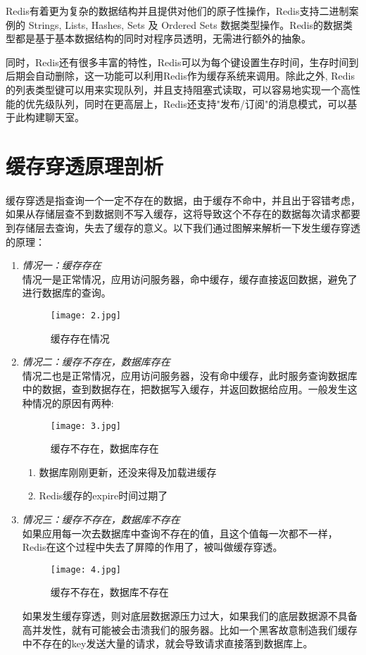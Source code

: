 \documentclass[lang=cn,11pt,a4paper,cite=numbers]{elegantpaper}
\begin{document}
Redis有着更为复杂的数据结构并且提供对他们的原子性操作，Redis支持二进制案例的 Strings, Lists, Hashes, Sets 及 Ordered Sets 数据类型操作。Redis的数据类型都是基于基本数据结构的同时对程序员透明，无需进行额外的抽象。

同时，Redis还有很多丰富的特性，Redis可以为每个键设置生存时间，生存时间到后期会自动删除，这一功能可以利用Redis作为缓存系统来调用。除此之外, Redis的列表类型键可以用来实现队列，并且支持阻塞式读取，可以容易地实现一个高性能的优先级队列，同时在更高层上，Redis还支持"发布/订阅"的消息模式，可以基于此构建聊天室。

\section{缓存穿透原理剖析}
\paragraph{}缓存穿透是指查询一个一定不存在的数据，由于缓存不命中，并且出于容错考虑， 如果从存储层查不到数据则不写入缓存，这将导致这个不存在的数据每次请求都要到存储层去查询，失去了缓存的意义。以下我们通过图解来解析一下发生缓存穿透的原理：
\begin{enumerate}[label=\arabic*).]
    \item \textit{情况一：缓存存在}\\
    情况一是正常情况，应用访问服务器，命中缓存，缓存直接返回数据，避免了进行数据库的查询。
    \begin{figure}[!htb]
        \centering
        \texttt{[image: 2.jpg]}
        \caption{缓存存在情况}
    \end{figure}
    \item \textit{情况二：缓存不存在，数据库存在}\\
    情况二也是正常情况，应用访问服务器，没有命中缓存，此时服务查询数据库中的数据，查到数据存在，把数据写入缓存，并返回数据给应用。一般发生这种情况的原因有两种:
    \begin{figure}[!htb]
        \centering
        \texttt{[image: 3.jpg]}
        \caption{缓存不存在，数据库存在}
    \end{figure}
    \begin{enumerate}
        \item 数据库刚刚更新，还没来得及加载进缓存
        \item Redis缓存的expire时间过期了
    \end{enumerate}

    \item \textit{情况三：缓存不存在，数据库不存在}\\
    如果应用每一次去数据库中查询不存在的值，且这个值每一次都不一样，Redis在这个过程中失去了屏障的作用了，被叫做缓存穿透。
    \begin{figure}[!htb]
        \centering
        \texttt{[image: 4.jpg]}
        \caption{缓存不存在，数据库不存在}
    \end{figure}
    如果发生缓存穿透，则对底层数据源压力过大，如果我们的底层数据源不具备高并发性，就有可能被会击溃我们的服务器。比如一个黑客故意制造我们缓存中不存在的key发送大量的请求，就会导致请求直接落到数据库上。
  \end{enumerate}
\end{document}
